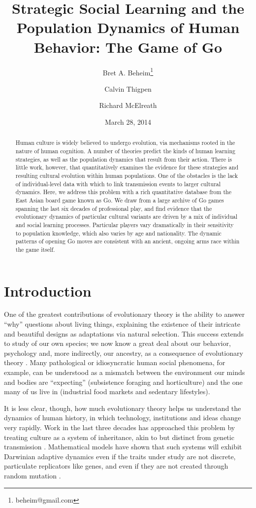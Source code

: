 \documentclass[12pt]{article}
\title{Strategic Social Learning and the Population Dynamics of Human Behavior: The Game of Go}
\author[1]{Bret A. Beheim\thanks{beheim@gmail.com}}
\author[2]{Calvin Thigpen}
\author[3]{Richard McElreath}
\affil[1]{\small Department of Anthropology, University of New Mexico}
\affil[2]{\small Institute for Transportation Studies, University of California, Davis}
\affil[3]{\small Department of Anthropology, University of California, Davis}
\date{March 28, 2014}
\begin{document}
\maketitle

\begin{abstract}
Human culture is widely believed to undergo evolution, via mechanisms rooted in the nature of human cognition. A number of theories predict the kinds of human learning strategies, as well as the population dynamics that result from their action. There is little work, however, that quantitatively examines the evidence for these strategies and resulting cultural evolution within human populations. One of the obstacles is the lack of individual-level data with which to link transmission events to larger cultural dynamics. Here, we address this problem with a rich quantitative database from the East Asian board game known as Go. We draw from a large archive of Go games spanning the last six decades of professional play, and find evidence that the evolutionary dynamics of particular cultural variants are driven by a mix of individual and social learning processes. Particular players vary dramatically in their sensitivity to population knowledge, which also varies by age and nationality. The dynamic patterns of opening Go moves are consistent with an ancient, ongoing arms race within the game itself.
\end{abstract}

\section{Introduction}

One of the greatest contributions of evolutionary theory is the ability to answer ``why'' questions about living things, explaining the existence of their intricate and beautiful designs as adaptations via natural selection. This success extends to study of our own species; we now know a great deal about our behavior, psychology and, more indirectly, our ancestry, as a consequence of evolutionary theory \citep{barkow1992adaptedmind, laland2002sense}. Many pathological or idiosyncratic human social phenomena, for example, can be understood as a mismatch between the environment our minds and bodies are ``expecting'' (subsistence foraging and horticulture) and the one many of us live in (industrial food markets and sedentary lifestyles).

It is less clear, though, how much evolutionary theory helps us understand the dynamics of human history, in which technology, institutions and ideas change very rapidly. Work in the last three decades has approached this problem by treating culture as a system of inheritance, akin to but distinct from genetic transmission \citep{durham1992coevolution, richerson2005genesalone}. Mathematical models have shown that such systems will exhibit Darwinian adaptive dynamics even if the traits under study are not discrete, particulate replicators like genes, and even if they are not created through random mutation \citep{boyd1985culture, henrich2002replicators}.
\end{document}
